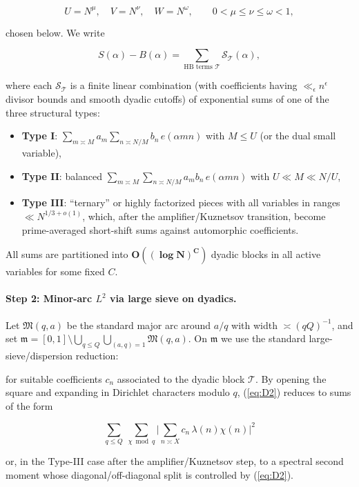\documentclass[11pt]{article}
\def\eqref#1{(\ref{#1})}%
\theoremstyle{definition}
\theoremstyle{remark}
\numberwithin{equation}{part}
\begin{document}
$$
	U=N^{\mu},\quad V=N^{\nu},\quad W=N^{\omega},\qquad 0<\mu\le\nu\le\omega<1,
$$

chosen below. We write

$$
	S(\alpha)-B(\alpha)
	=\sum_{\text{HB terms }\mathcal T} \mathcal S_{\mathcal T}(\alpha),
$$

where each $\mathcal S_{\mathcal T}$ is a finite linear combination (with coefficients having $\ll_\epsilon n^\epsilon$ divisor bounds and smooth dyadic cutoffs) of exponential sums of one of the three structural types:

\begin{itemize}
	\item \textbf{Type I}: $\displaystyle \sum_{m\asymp M} a_m \sum_{n\asymp N/M} b_n\,e(\alpha mn)$ with $M\le U$ (or the dual small variable),
	\item \textbf{Type II}: balanced $\displaystyle \sum_{m\asymp M}\sum_{n\asymp N/M} a_m b_n\,e(\alpha mn)$ with $U\ll M\ll N/U$,
	\item \textbf{Type III}: ``ternary'' or highly factorized pieces with all variables in ranges $ \ll N^{1/3+o(1)}$, which, after the amplifier/Kuznetsov transition, become prime-averaged short-shift sums against automorphic coefficients.
\end{itemize}

All sums are partitioned into $\mathbf{O((\log N)^C)}$ dyadic blocks in all active variables for some fixed $C$.

\paragraph{Step 2: Minor-arc $L^2$ via large sieve on dyadics.}
Let $\mathfrak M(q,a)$ be the standard major arc around $a/q$ with width $\asymp (qQ)^{-1}$, and set $\mathfrak m=[0,1]\setminus \bigcup_{q\le Q}\bigcup_{(a,q)=1}\mathfrak M(q,a)$. On $\mathfrak m$ we use the standard large-sieve/dispersion reduction:

for suitable coefficients $c_n$ associated to the dyadic block $\mathcal T$. By opening the square and expanding in Dirichlet characters modulo $q$, \eqref{eq:D2} reduces to sums of the form

\begin{equation}\label{eq:D3}
	\sum_{q\le Q}\ \sum_{\chi\bmod q}
	\Big|\sum_{n\asymp X} c_n\,\lambda(n)\chi(n)\Big|^2
\end{equation}

or, in the Type-III case after the amplifier/Kuznetsov step, to a spectral second moment whose diagonal/off-diagonal split is controlled by \eqref{eq:D2}.
\end{document}
